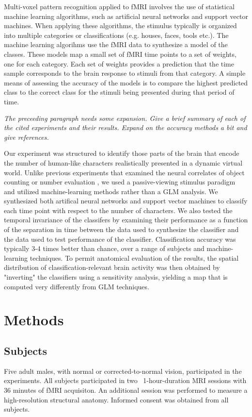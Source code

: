\documentclass[preprint,5p,authoryear]{elsarticle}
\begin{document}
Multi-voxel pattern recognition applied to fMRI involves the use of statistical machine learning algorithms, such as artificial neural networks and support vector machines\citep{Haxby2001,Mitchell2003,Haynes2006}.
When applying these algorithms, the stimulus typically is organized into multiple categories or classifications (e.g. houses, faces, tools etc.).
The machine learning algorihms use the fMRI data to synthesize a model of the classes.
These models map a small set of fMRI time points to a set of weights, one for each category.
Each set of weights provides a prediction that the time sample corresponds to the brain response to stimuli from that category.
A simple means of assessing the accuracy of the models is to compare the highest predicted class to the correct class for the stimuli being presented during that period of time.

\emph{The preceeding paragraph needs some expansion. Give a brief summary of each of the cited experiments and their results. Expand on the accuracy methods a  bit and give references.}

Our experiment was structured to identify those parts of the brain that encode the number of human-like characters realistically presented in a dynamic virtual world.
Unlike previous experiments that examined the neural correlates of object counting or number evaluation \citep{countingstuff}, we used a passive-viewing stimulus paradigm and utilized machine-learning methods rather than a GLM analysis.
We synthesized both artifical neural networks and support vector machines to classify each time point with respect to the number of characters.
We also tested the temporal invariance of the classifers by examining their performance as a function of the separation in time between the data used to synthesize the classifier and the data used to test performance of the classifier.
Classification accuracy was typically 3-4 times better than chance, over a range of subjects and machine-learning techniques.
To permit anatomical evaluation of the results, the spatial distribution of classification-relevant brain activity was then obtained by "inverting" the classifiers using a sensitivity analysis,
yielding a map that is computed very differently from GLM  techniques.

\section{Methods}

\subsection{Subjects}
Five adult males, with normal or corrected-to-normal vision, participated in the experiments. 
All subjects participated in two ~1-hour-duration MRI sessions with 36 minutes of fMRI acquisiton. An additional session was performed to measure a high-resolution structural anatomy. 
Informed consent was obtained from all subjects.
\end{document}
